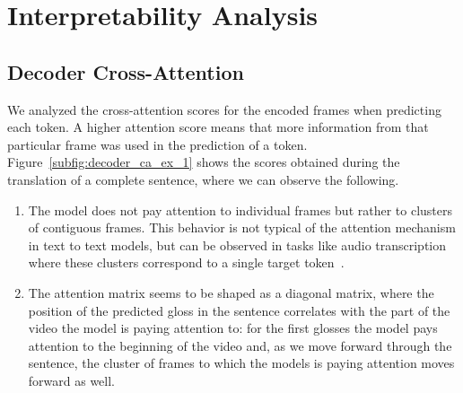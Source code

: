 \section{Interpretability Analysis}


\subsection{Decoder Cross-Attention}

We analyzed the cross-attention scores for the encoded frames when predicting each token. A higher attention score means that more information from that particular frame was used in the prediction of a token. Figure~\ref{subfig:decoder_ca_ex_1} shows the scores obtained during the translation of a complete sentence, where we can observe the following.

\begin{enumerate}
    
    \item The model does not pay attention to individual frames but rather to clusters of contiguous frames. This behavior is not typical of the attention mechanism in text to text models, but can be observed in tasks like audio transcription where these clusters correspond to a single target token~\cite{luo2020simplified}.

    \item The attention matrix seems to be shaped as a diagonal matrix, where the position of the predicted gloss in the sentence correlates with the part of the video the model is paying attention to: for the first glosses the model pays attention to the beginning of the video and, as we move forward through the sentence, the cluster of frames to which the models is paying attention moves forward as well.
    
\end{enumerate}

